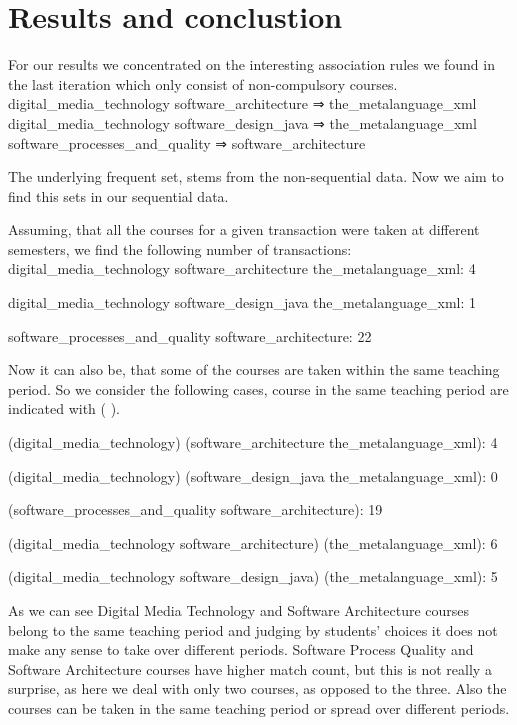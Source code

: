 \section{Results and conclustion}
For our results we concentrated on the interesting association rules we found in the last iteration which only consist of non-compulsory courses.
\newline
digital\_media\_technology software\_architecture ⇒  the\_metalanguage\_xml
digital\_media\_technology software\_design\_java ⇒ the\_metalanguage\_xml
software\_processes\_and\_quality ⇒ software\_architecture

The underlying frequent set,  stems from the non-sequential data. Now we aim to find this sets in our sequential data.

Assuming, that all the courses for a given transaction were taken at different semesters, we find the following number of transactions:\\
\newline
digital\_media\_technology software\_architecture the\_metalanguage\_xml:    4
 
digital\_media\_technology software\_design\_java  the\_metalanguage\_xml:    1

software\_processes\_and\_quality software\_architecture:                   22

\newline

Now it can also be, that some of the courses are taken within the same teaching period. So we consider the following cases, course in the same teaching period are indicated with ( ).\\
\newline

(digital\_media\_technology) (software\_architecture the\_metalanguage\_xml):        4

(digital\_media\_technology) (software\_design\_java  the\_metalanguage\_xml):       0 

(software\_processes\_and\_quality software\_architecture):                          19

(digital\_media\_technology software\_architecture) (the\_metalanguage\_xml):        6
 
(digital\_media\_technology software\_design\_java)  (the\_metalanguage\_xml):       5


As we can see Digital Media Technology and Software Architecture courses belong to the same teaching period and judging by students’ choices it does not make any sense to take over different periods. Software Process Quality and Software Architecture courses have higher match count, but this is not really a surprise, as here we deal with only two courses, as opposed to the three. Also the courses can be taken in the same teaching period or spread over different periods.
